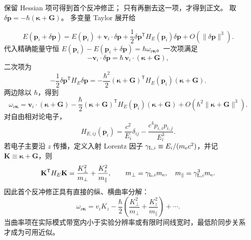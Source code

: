 

\begin{derivation}
保留 Hessian 项可得到首个反冲修正； 只有再删去这一项，才得到正文。 取
$\delta\mathbf p=-\hbar(\boldsymbol\kappa+\mathbf G)$。 多变量 Taylor 展开给

\[
E(\mathbf p_i+\delta\mathbf p)
=E(\mathbf p_i)+\mathbf v_i\cdot\delta\mathbf p
+\frac12\delta\mathbf p^{\mathsf T}H_E(\mathbf p_i)\delta\mathbf p
+O(\|\delta\mathbf p\|^3).
\]
代入精确能量守恒
$E(\mathbf p_i)-E(\mathbf p_i+\delta\mathbf p)=\hbar\omega_{\nu\boldsymbol\kappa}$。一次项满足
\[
-\mathbf v_i\cdot\delta\mathbf p
=\hbar\,\mathbf v_i\cdot(\boldsymbol\kappa+\mathbf G),
\]
二次项为
\[
-\frac12\delta\mathbf p^{\mathsf T}H_E\delta\mathbf p
=-\frac{\hbar^2}{2}(\boldsymbol\kappa+\mathbf G)^{\mathsf T}
H_E(\mathbf p_i)(\boldsymbol\kappa+\mathbf G).
\]
两边除以 $\hbar$，得到
\[
\omega_{\nu\boldsymbol\kappa}
=\mathbf v_i\cdot(\boldsymbol\kappa+\mathbf G)
-\frac{\hbar}{2}(\boldsymbol\kappa+\mathbf G)^{\mathsf T}
H_E(\mathbf p_i)(\boldsymbol\kappa+\mathbf G)
+O(\hbar^2\|\boldsymbol\kappa+\mathbf G\|^3).
\]
对自由相对论电子，
\[
H_{E,ij}(\mathbf p_i)
=\frac{c^2}{E_i}\delta_{ij}
-\frac{c^4p_{i,i}p_{i,j}}{E_i^3}.
\]
若电子主要沿 $z$ 传播，定义入射 Lorentz 因子 $\gamma_{{\rm L},i}\equiv E_i/(m_{\mathrm e} c^2)$，并记 $\mathbf K\equiv\boldsymbol\kappa+\mathbf G$，则
\[
\mathbf K^{\mathsf T}H_E\mathbf K
=\frac{K_\perp^2}{m_\perp}+\frac{K_z^2}{m_\parallel},
\qquad
m_\perp=\gamma_{{\rm L},i}m_{\mathrm e},
\quad
m_\parallel=\gamma_{{\rm L},i}^3m_{\mathrm e}.
\]
因此首个反冲修正具有直接的纵、横曲率分解：
\[
\omega_{\nu\boldsymbol\kappa}
=v_iK_z-
\frac{\hbar}{2}
\left(\frac{K_\perp^2}{m_\perp}+\frac{K_z^2}{m_\parallel}\right)+\cdots.
\]
当曲率项在实际模式带宽内小于实验分辨率或有限时间线宽时，最低阶同步关系~ 才成为可用近似。
\end{derivation}

